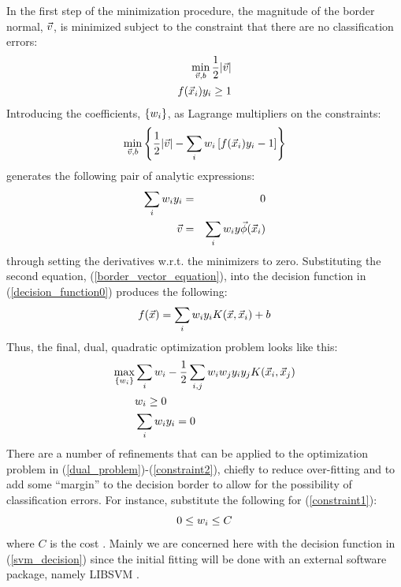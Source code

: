 \documentclass[11pt]{article}
\begin{document}
In the first step of the minimization procedure, 
the magnitude of the border normal, $\vec v$, 
is minimized subject to the constraint that there are no classification 
errors:
\begin{eqnarray}
	\min_{\vec v, b} \frac{1}{2} | \vec v | \\ \nonumber
	f(\vec {x}_i) y_i \ge 1
\end{eqnarray}
Introducing the coefficients, $\lbrace w_i \rbrace$, 
as Lagrange multipliers on the constraints:
\begin{equation}
	\min_{\vec v, b} \left \lbrace \frac{1}{2} | \vec v | - \sum_i w_i \left [ f(\vec {x}_i) y_i -1 \right ] \right \rbrace
\end{equation}
generates the following pair of analytic expressions:
\begin{eqnarray}
	\sum_i w_i y_i & = & 0 \\
	\vec v & = & \sum_i w_i y \vec\phi(\vec {x}_i) \label{border_vector_equation}
\end{eqnarray}
through setting the derivatives w.r.t. the minimizers to zero.
Substituting the second equation, (\ref{border_vector_equation}),
into the decision function in (\ref{decision_function0}) produces the following:
\begin{equation}
	f(\vec {x}) = \sum_i w_i y_i K (\vec {x}, \vec {x}_i) + b
	\label{svm_decision}
\end{equation}
Thus, the final, dual, quadratic optimization problem looks like this:
\begin{eqnarray}
	\max_{\lbrace w_i \rbrace} & \sum_i w_i 
	- \frac{1}{2} \sum_{i, j} w_i w_j y_i y_j K(\vec {x}_i, \vec {x}_j) \label{dual_problem} \\
	& w_i \ge 0 \label{constraint1} \\
	& \sum_i w_i y_i = 0 \label{constraint2}
\end{eqnarray}
There are a number of refinements that can be applied to the optimization
problem in (\ref{dual_problem})-(\ref{constraint2}), chiefly to reduce over-fitting and to add
some ``margin'' to the decision border to allow for the possibility of
classification errors.
For instance, substitute the following for (\ref{constraint1}):
\begin{equation}
 0 \le w_i \le C
\end{equation}
where $C$ is the cost \citep{kernel_intro}.
Mainly we are concerned here with the decision
function in (\ref{svm_decision}) since the initial fitting will be done with
an external software package, namely LIBSVM \citep{Chang_Lin2011}.
\end{document}
